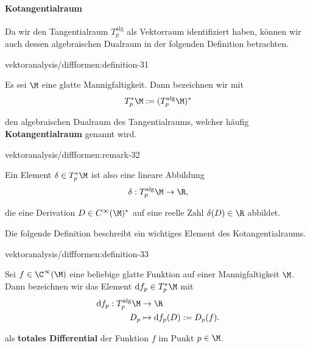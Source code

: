 \documentclass[letterpaper,10pt,english]{jupyterBook}
\begin{document}
\paragraph{Kotangentialraum}
\label{\detokenize{vektoranalysis/diffformen:kotangentialraum}}
\par
Da wir den Tangentialraum \(T^{\text{alg}}_p\) als Vektorraum identifiziert haben, können wir auch dessen algebraischen Dualraum in der folgenden Definition betrachten.
\begin{definition}{}{vektoranalysis/diffformen:definition-31}



\par
Es sei \(\M\) eine glatte Mannigfaltigkeit.
Dann bezeichnen wir mit
\begin{align*}
T_p^\ast\M:= (T_p^{\text{alg}}\M)^\ast
\end{align*}
\par
den algebraischen Dualraum des Tangentialraums, welcher häufig \textbf{Kotangentialraum} genannt wird.
\end{definition}
\begin{remark}{}{vektoranalysis/diffformen:remark-32}



\par
Ein Element \(\delta\in T_p^\ast\M\) ist also eine lineare Abbildung
\begin{align*}
\delta: T_p^{\text{alg}}\M \to \R,
\end{align*}
\par
die eine Derivation \(D\in C^\infty(\M)^\ast\) auf eine reelle Zahl \(\delta(D)\in\R\) abbildet.
\end{remark}

\par
Die folgende Definition beschreibt ein wichtiges Element des Kotangentialraums.
\begin{definition}{}{vektoranalysis/diffformen:definition-33}



\par
Sei \(f\in\C^\infty(\M)\) eine beliebige glatte Funktion auf einer Mannigfaltigkeit \(\M\).
Dann bezeichnen wir das Element \(\mathrm{d}f_p \in T_p^\ast\M\) mit
\begin{align*}
\mathrm{d}f_p: T_p^{\text{alg}}\M &\to\R\\
D_p &\mapsto \mathrm{d}f_p(D):= D_p(f).
\end{align*}
\par
als \textbf{totales Differential} der Funktion \(f\) im Punkt \(p \in \M\).
\end{definition}
\end{document}
